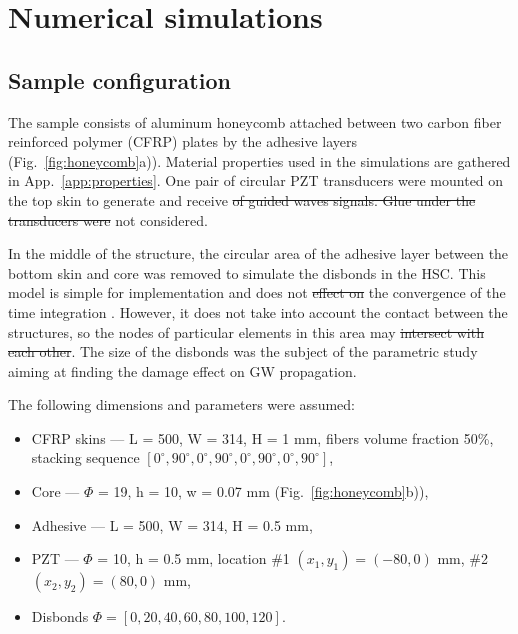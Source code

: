 \documentclass[materials,article,submit,moreauthors,pdftex]{Definitions/mdpi}
\providecommand{\DIFadd}[1]{{\protect\color{blue}{#1}}} %
\providecommand{\DIFdel}[1]{{\protect\color{red}\sout{#1}}}                      %
\providecommand{\DIFaddbegin}{} %
\providecommand{\DIFaddend}{} %
\providecommand{\DIFdelbegin}{} %
\providecommand{\DIFdelend}{} %
\begin{document}
\section{Numerical simulations}
\label{sec:numerical}
\subsection{Sample configuration}
\label{sec:sample}
The sample consists of aluminum honeycomb attached between two carbon fiber reinforced polymer (CFRP) plates by the adhesive layers (Fig.~\ref{fig:honeycomb}a)).
Material properties used in the simulations are gathered in App.~\ref{app:properties}.
One pair of circular PZT transducers were mounted on the top skin to generate and receive \DIFdelbegin \DIFdel{of guided waves signals.
Glue under the transducers were }\DIFdelend \DIFaddbegin \DIFadd{GW signals.
A glue layer under transducers was }\DIFaddend not considered.

In the middle of the structure, the circular area of the adhesive layer between the bottom skin and \DIFaddbegin \DIFadd{the }\DIFaddend core was removed to simulate the disbonds in the HSC.
This model is simple for implementation and does not \DIFdelbegin \DIFdel{effect on }\DIFdelend \DIFaddbegin \DIFadd{affect }\DIFaddend the convergence of the time integration \DIFaddbegin \DIFadd{algorithm}\DIFaddend .
However, it does not take into account the contact between the structures, so the nodes of particular elements in this area may \DIFdelbegin \DIFdel{intersect with each other}\DIFdelend \DIFaddbegin \DIFadd{interpenetrate}\DIFaddend .
The size of the disbonds was the subject of the parametric study aiming at finding the damage effect on GW propagation.

The following dimensions and parameters were assumed:
\begin{itemize}
	\item CFRP skins --- L = 500, W = 314, H = 1 mm, fibers volume fraction 
	50\%, stacking sequence 
	\([0^\circ,90^\circ,0^\circ,90^\circ,0^\circ,90^\circ,0^\circ,90^\circ]\),
	\item Core --- \(\Phi\) = 19, h = 10, w = 0.07 mm 
	(Fig.~\ref{fig:honeycomb}b)),
	\item Adhesive --- L = 500, W = 314, H = 0.5 mm,
	\item PZT --- \(\Phi\) = 10, h = 0.5 mm, location \#1 \((x_1,y_1)=(-80,0)\) 
	mm,	\#2 \((x_2,y_2)=(80,0)\) mm,
	\item Disbonds \(\Phi = \left [0, 20, 40, 60, 80, 100, 120 \right ]\).
\end{itemize}
\end{document}
